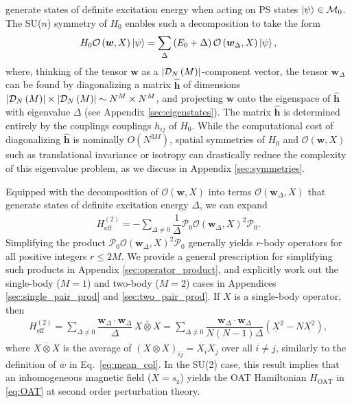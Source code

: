 \documentclass[nofootinbib,notitlepage,11pt]{revtex4-2}
\renewcommand{\t}{\text} %
\newcommand{\f}[2]{\dfrac{#1}{#2}} %
\newcommand{\p}[1]{\left(#1\right)} %
\renewcommand{\c}{\cdot} %
\newcommand{\m}{\bm} %
\newcommand{\1}{\mathds{1}}
\newcommand{\z}{\text{z}}
\newcommand{\D}{\mathcal{D}}
\newcommand{\M}{\mathcal{M}}
\renewcommand{\O}{\mathcal{O}}
\renewcommand{\P}{\mathcal{P}}
\newcommand{\col}{\underline}
\newcommand{\mean}{\overline}
\begin{document}
generate states of definite excitation energy when acting on PS states
$\ket\psi\in\M_0$.  The SU($n$) symmetry of $H_0$ enables such a
decomposition to take the form
\begin{align}
  H_0 \O\p{\m w,X} \ket\psi
  = \sum_\Delta \p{E_0+\Delta} \O\p{\m w_\Delta,X} \ket\psi,
  \label{eq:excitation}
\end{align}
where, thinking of the tensor $\m w$ as a $\abs{\D_N\p{M}}$-component
vector, the tensor $\m w_\Delta$ can be found by diagonalizing a
matrix $\hat{\m h}$ of dimensions
$\abs{\D_N\p{M}}\times\abs{\D_N\p{M}}\sim N^M\times N^M$, and
projecting $\m w$ onto the eigenspace of $\hat{\m h}$ with eigenvalue
$\Delta$ (see Appendix \ref{sec:eigenstates}).  The matrix
$\hat{\m h}$ is determined entirely by the couplings couplings
$h_{ij}$ of $H_0$.  While the computational cost of diagonalizing
$\hat{\m h}$ is nominally $O\p{N^{3M}}$, spatial symmetries of $H_0$
and $\O\p{\m w,X}$ such as translational invariance or isotropy can
drastically reduce the complexity of this eigenvalue problem, as we
discuss in Appendix \ref{sec:symmetries}.

Equipped with the decomposition of $\O\p{\m w,X}$ into terms
$\O\p{\m w_\Delta,X}$ that generate states of definite excitation
energy $\Delta$, we can expand
\begin{align}
  H_{\t{eff}}^{(2)} = -\sum_{\Delta\ne0} \f1\Delta
  \P_0 \O\p{\m w_\Delta,X}^2 \P_0.
\end{align}
Simplifying the product $\P_0 \O\p{\m w_\Delta,X}^2 \P_0$ generally
yields $r$-body operators for all positive integers $r\le2M$.  We
provide a general prescription for simplifying such products in
Appendix \ref{sec:operator_product}, and explicitly work out the
single-body ($M=1$) and two-body ($M=2$) cases in Appendices
\ref{sec:single_pair_prod} and \ref{sec:two_pair_prod}.  If $X$ is a
single-body operator, then
\begin{align}
  H_{\t{eff}}^{(2)}
  = \sum_{\Delta\ne0} \f{\m w_\Delta\c\m w_\Delta}{\Delta} \,
  \mean{X\otimes X}
  = \sum_{\Delta\ne0} \f{\m w_\Delta\c\m w_\Delta}{N\p{N-1}\Delta}
  \p{\col{X}^2 - N \col{X^2}},
  \label{eq:H_eff_2_1}
\end{align}
where $\mean{X\otimes X}$ is the average of
$\p{X\otimes X}_{ij}=X_iX_j$ over all $i\ne j$, similarly to the
definition of $\mean{w}$ in Eq.~\eqref{eq:mean_col}.  In the SU(2)
case, this result implies that an inhomogeneous magnetic field
($X=s_\z$) yields the OAT Hamiltonian $H_{\t{OAT}}$ in \eqref{eq:OAT}
at second order perturbation theory.
\end{document}
